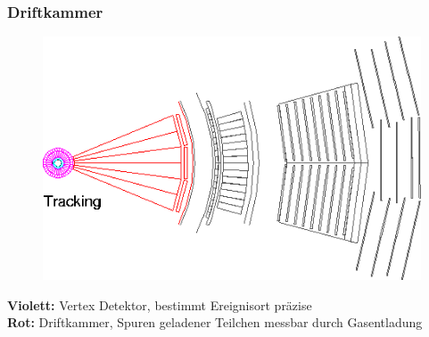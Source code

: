\begin{frame}
	\frametitle{Driftkammer}
	\begin{center}
		\begin{figure}
			\includegraphics[width=0.75\linewidth]{graphics/slice_tracking_tr}
		\end{figure}
	\end{center}
	\textbf{Violett:} Vertex Detektor, bestimmt Ereignisort präzise\\
	\textbf{Rot:} Driftkammer, Spuren geladener Teilchen messbar durch Gasentladung
\end{frame}

